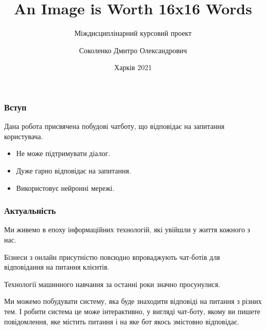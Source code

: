 \documentclass{beamer}
\title{An Image is Worth 16x16 Words}
\subtitle{Міждисциплінарний курсовий проект}
\author[Соколенко]{
    Соколенко Дмитро Олександрович
}
\institute[ХНУРЕ]{ІТШІ-18-1 
    \\ \vspace{0.4cm}
    Керівник: Вітько О. В.
}
\date{Харків 2021}
\begin{document}
\frame{\titlepage}

\begin{frame}
    \frametitle{Вступ}

    Дана робота присвячена побудові чатботу, що відповідає на запитання користувача.

    \begin{itemize}
        \item Не може підтримувати діалог.


        \item Дуже гарно відповідає на запитання.
        \item Використовує нейронні мережі.
    \end{itemize}
    
\end{frame}

\begin{frame}
    \frametitle{Актуальність}
    Ми живемо в епоху інформаційних технологій, які увійшли у життя кожного з нас. 

    Бізнеси з онлайн присутністю повсюдно впроваджують чат-ботів для відповідання на питання клієнтів.

    Технології машинного навчання за останні роки значно просунулися.


    Ми можемо побудувати систему, яка буде знаходити відповіді на питання з різних тем. І робити система це може інтерактивно, у вигляді чат-боту, якому ви пишете повідомлення, яке містить питання і на яке бот якось змістовно відповідає.

\end{frame}
\end{document}
